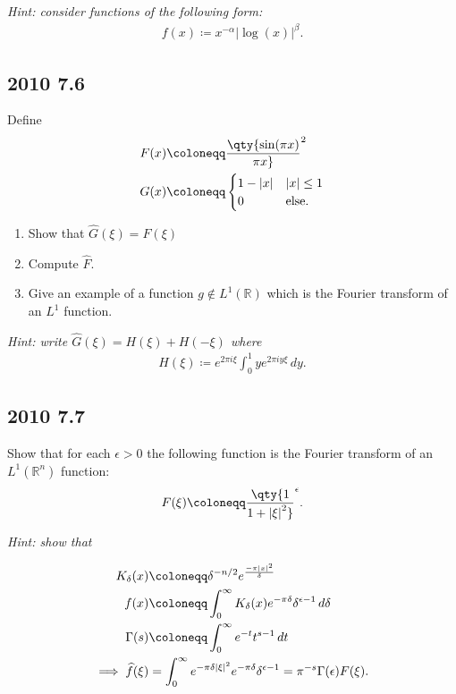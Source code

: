 \emph{Hint: consider functions of the following form:}
\begin{align*}
f(x) \coloneqq x^{- \alpha} {\left\lvert { \log(x) } \right\rvert}^{ \beta}
.\end{align*}

\hypertarget{section-8}{%
\subsection{2010 7.6}\label{section-8}}

Define
\begin{align*}
F(x) &\coloneqq\qty{ \sin(\pi x) \over \pi x}^2 \\
G(x) &\coloneqq
\begin{cases}
1 - {\left\lvert {x} \right\rvert} & {\left\lvert {x} \right\rvert} \leq 1
\\
0 & \text{else}.
\end{cases}
\end{align*}

\begin{enumerate}
\def\labelenumi{\alph{enumi}.}
\item
  Show that \(\widehat{G}(\xi) = F(\xi)\)
\item
  Compute \(\widehat{F}\).
\item
  Give an example of a function \(g\not \in L^1({\mathbb{R}})\) which is
  the Fourier transform of an \(L^1\) function.
\end{enumerate}

\emph{Hint: write \(\widehat{G}(\xi) = H(\xi) + H(-\xi)\) where}
\begin{align*}
H(\xi) \coloneqq e^{2\pi i \xi} \int_0^1 y e^{2\pi i y \xi }\,dy
.\end{align*}

\hypertarget{section-9}{%
\subsection{2010 7.7}\label{section-9}}

Show that for each \(\epsilon>0\) the following function is the Fourier
transform of an \(L^1({\mathbb{R}}^n)\) function:
\begin{align*}
F(\xi) \coloneqq\qty{1 \over 1 + {\left\lvert {\xi} \right\rvert}^2}^{\epsilon}
.\end{align*}

\emph{Hint: show that}

\begin{align*}
K_\delta(x) &\coloneqq\delta^{-n/2} e^{-\pi {\left\lvert {x} \right\rvert}^2 \over \delta} \\
f(x) &\coloneqq\int_0^{\infty } K_{\delta}(x) e^{-\pi \delta} \delta^{\epsilon - 1} \,d \delta \\
\Gamma(s) &\coloneqq\int_0^{\infty } e^{-t} t^{s-1} \,dt\\
\implies \widehat{f}(\xi) &= \int_0^{\infty } e^{- \pi \delta {\left\lvert {\xi} \right\rvert}^2} e^{ -\pi \delta} \delta^{\epsilon - 1}
= \pi^{-s} \Gamma(\epsilon) F(\xi)
.\end{align*}

